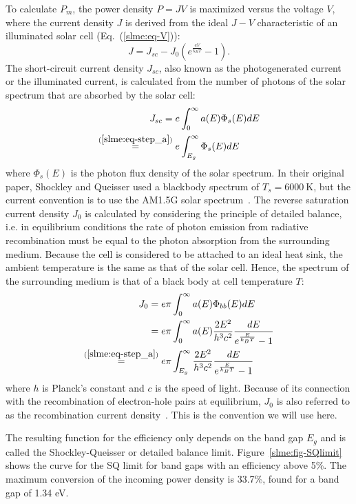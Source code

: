 \begin{refsection}
To calculate $P_m$, the power density $P = JV$ is maximized versus the voltage 
$V$, where the current density $J$ is derived from the ideal $J-V$ 
characteristic of an illuminated solar cell (Eq.~(\ref{slme:eq-V})): 
\begin{equation}\label{slme:eq-JV} 
J = J_{sc} - J_0 \left(e^{\frac{eV}{k_B T}} - 1\right). 
\end{equation} 
The short-circuit current density $J_{sc}$, also known as the photogenerated 
current or the illuminated current, is calculated from the number of photons 
of the solar spectrum that are absorbed by the solar cell: 
\begin{align} 
J_{sc} = e &\int_0^{\infty} a(E) \Phi_s (E) dE \\ 
\stackrel{(\ref{slme:eq-step_a})}{=} e &\int_{E_g}^{\infty} \Phi_s (E) dE 
\label{slme:eq-Ish} 
\end{align} 
where $\Phi_s(E)$ is the photon flux density of the solar spectrum. In their 
original paper, Shockley and Queisser used a blackbody spectrum of $T_s = 
6000~\si{\kelvin}$, but the current convention is to use the AM1.5G solar 
spectrum~\cite{International2012}.  The reverse saturation current density 
$J_0$ is calculated by considering the principle of detailed balance, i.e. in 
equilibrium conditions the rate of photon emission from radiative 
recombination must be equal to the photon absorption from the surrounding 
medium. Because the cell is considered to be attached to an ideal heat sink, 
the ambient temperature is the same as that of the solar cell. Hence, the 
spectrum of the surrounding medium is that of a black body at cell temperature 
$T$: 
\begin{align} 
J_0 = e \pi &\int_0^{\infty} a(E) \Phi_{bb}(E) dE\nonumber \\ 
= e \pi &\int_0^{\infty} a(E) \frac{2E^2}{h^3 c^2} \frac{dE}{e^{\frac{E}{k_B 
T}}-1} \\ 
\stackrel{(\ref{slme:eq-step_a})}{=} e \pi &\int_{E_g}^{\infty} 
\frac{2E^2}{h^3 c^2} \frac{dE}{e^{\frac{E}{k_B T}}-1} \label{slme:eq-I0} 
\end{align} 
where $h$ is Planck's constant and $c$ is the speed of light. Because of its 
connection with the recombination of electron-hole pairs at equilibrium, $J_0$ 
is also referred to as the recombination current density~\cite{Cuevas2014}. 
This is the convention we will use here. 
 
The resulting function for the efficiency only depends on the band gap $E_g$ 
and is called the Shockley-Queisser or detailed balance limit. 
Figure~\ref{slme:fig-SQlimit} shows the curve for the SQ limit for band gaps 
with an efficiency above 5\%. The maximum conversion of the incoming power 
density is 33.7\%, found for a band gap of 1.34 eV. 
 

\end{refsection}
